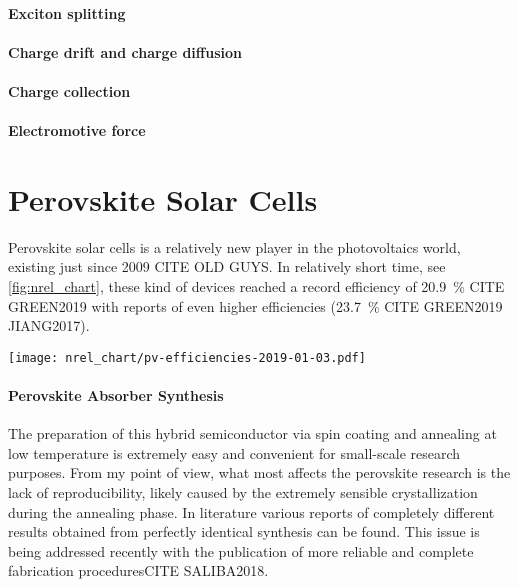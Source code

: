 \paragraph{Exciton splitting}

\paragraph{Charge drift and charge diffusion}

\paragraph{Charge collection}

\paragraph{Electromotive force}

\section{Perovskite Solar Cells}

Perovskite solar cells is a relatively new player in the photovoltaics world, existing just since 2009 CITE OLD GUYS. In relatively short time, see \cref{fig:nrel_chart}, these kind of devices reached a record efficiency of 20.9~\% CITE GREEN2019 with reports of even higher efficiencies (23.7~\% CITE GREEN2019 JIANG2017).


\begin{SCfigure}
	\centering
	\texttt{[image: nrel\_chart/pv-efficiencies-2019-01-03.pdf]}
	\label{fig:nrel_chart}
\end{SCfigure}


\paragraph{Perovskite Absorber Synthesis}

The preparation of this hybrid semiconductor via spin coating and annealing at low temperature is extremely easy and convenient for small-scale research purposes. From my point of view, what most affects the perovskite research is the lack of reproducibility, likely caused by the extremely sensible crystallization during the annealing phase. In literature various reports of completely different results obtained from perfectly identical synthesis can be found\cite{Pockett2015,Gottesman2014}. This issue is being addressed recently with the publication of more reliable and complete fabrication proceduresCITE SALIBA2018.


